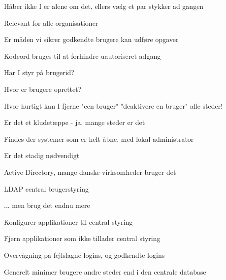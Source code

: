 \documentclass[Screen16to9,17pt]{foils}
\begin{document}
\vskip 5mm
\centerline{Håber ikke I er alene om det, ellers vælg et par stykker ad gangen}



\begin{list2}
\item Relevant for alle organisationer
\item Er måden vi sikrer godkendte brugere kan udføre opgaver
\item Kodeord bruges til at forhindre uautoriseret adgang
\end{list2}




\begin{list2}
\item Har I styr på brugerid?
\item Hvor er brugere oprettet?
\item Hvor hurtigt kan I fjerne "een bruger" "deaktivere en bruger" alle steder!
\item Er det et kludetæppe - ja, mange steder er det
\end{list2}





\begin{list2}
\item Findes der systemer som er helt åbne, med lokal administrator
\item Er det stadig nødvendigt
\end{list2}



\begin{list1}
\item Active Directory, mange danske virksomheder bruger det
\item LDAP central brugerstyring
\item ... men brug det endnu mere
\begin{list2}
\item Konfigurer applikationer til central styring
\item Fjern applikationer som ikke tillader central styring
\item Overvågning på fejlslagne logins, og godkendte logins
\end{list2}
\item Generelt minimer brugere andre steder end i den centrale database
\end{list1}
\end{document}
